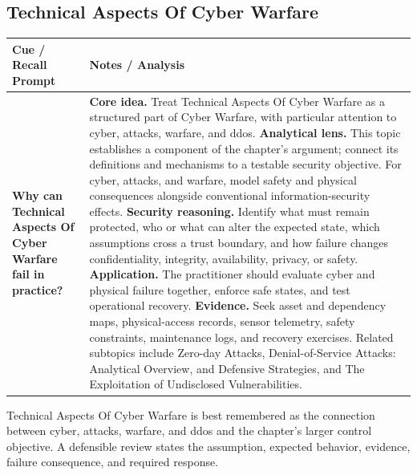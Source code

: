 \documentclass[11pt]{article}
\newcommand{\CornellHeader}{%
\rowcolor{Navy}\color{white}\bfseries Cue / Recall Prompt & \color{white}\bfseries Notes / Analysis\\\hline}
\newcommand{\CornellRow}[2]{%
\cellcolor{CueGray}\RaggedRight\textbf{#1} & \RaggedRight #2\\\hline}
\begin{document}
\subsection*{Technical Aspects Of Cyber Warfare}
\begin{longtable}{>{\RaggedRight\arraybackslash}p{}|>{\RaggedRight\arraybackslash}p{}}
\CornellHeader
\CornellRow{Why can Technical Aspects Of Cyber Warfare fail in practice?}{\textbf{Core idea.} Treat Technical Aspects Of Cyber Warfare as a structured part of Cyber Warfare, with particular attention to cyber, attacks, warfare, and ddos. \textbf{Analytical lens.} This topic establishes a component of the chapter's argument; connect its definitions and mechanisms to a testable security objective. For cyber, attacks, and warfare, model safety and physical consequences alongside conventional information-security effects. \textbf{Security reasoning.} Identify what must remain protected, who or what can alter the expected state, which assumptions cross a trust boundary, and how failure changes confidentiality, integrity, availability, privacy, or safety. \textbf{Application.} The practitioner should evaluate cyber and physical failure together, enforce safe states, and test operational recovery. \textbf{Evidence.} Seek asset and dependency maps, physical-access records, sensor telemetry, safety constraints, maintenance logs, and recovery exercises. Related subtopics include Zero-day Attacks, Denial-of-Service Attacks: Analytical Overview, and Defensive Strategies, and The Exploitation of Undisclosed Vulnerabilities.}
\end{longtable}
\begin{topicsummary}
Technical Aspects Of Cyber Warfare is best remembered as the connection between cyber, attacks, warfare, and ddos and the chapter's larger control objective. A defensible review states the assumption, expected behavior, evidence, failure consequence, and required response.
\end{topicsummary}
\end{document}
